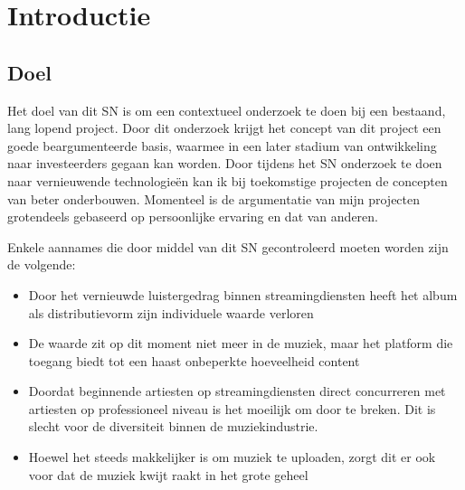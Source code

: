 \section{Introductie}

\subsection{Doel}
Het doel van dit SN is om een contextueel onderzoek te doen bij een bestaand, lang lopend project. Door dit onderzoek krijgt het concept van dit project een goede beargumenteerde basis, waarmee in een later stadium van ontwikkeling naar investeerders gegaan kan worden. Door tijdens het SN onderzoek te doen naar vernieuwende technologieën kan ik bij toekomstige projecten de concepten van beter onderbouwen. Momenteel is de argumentatie van mijn projecten grotendeels gebaseerd op persoonlijke ervaring en dat van anderen.

Enkele aannames die door middel van dit SN gecontroleerd moeten worden zijn de volgende:

\begin{itemize}
    \item Door het vernieuwde luistergedrag binnen streamingdiensten heeft het album als distributievorm zijn individuele waarde verloren
    \item De waarde zit op dit moment niet meer in de muziek, maar het platform die toegang biedt tot een haast onbeperkte hoeveelheid content
    \item Doordat beginnende artiesten op streamingdiensten direct concurreren met artiesten op professioneel niveau is het moeilijk om door te breken. Dit is slecht voor de diversiteit binnen de muziekindustrie.
    \item Hoewel het steeds makkelijker is om muziek te uploaden, zorgt dit er ook voor dat de muziek kwijt raakt in het grote geheel
\end{itemize}

